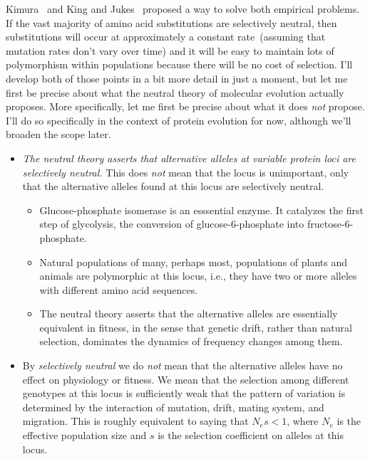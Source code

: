 Kimura~\cite{Kimura68} and King and Jukes~\cite{King-Jukes69} proposed
a way to solve both empirical problems. If the vast majority of amino
acid substitutions are selectively neutral, then substitutions will
occur at approximately a constant rate~(assuming that mutation rates
don't vary over time) and it will be easy to maintain lots of
polymorphism within populations because there will be no cost of
selection. I'll develop both of those points in a bit more detail in
just a moment, but let me first be precise about what the neutral
theory of molecular evolution actually proposes. More specifically,
let me first be precise about what it does {\it not\/} propose. I'll
do so specifically in the context of protein evolution for now,
although we'll broaden the scope later.

\begin{itemize}

\item {\it The neutral theory asserts that alternative alleles at
    variable protein loci are selectively neutral.} This does {\it
    not\/} mean that the locus is unimportant, only that the
  alternative alleles found at this locus are selectively
  neutral.

\begin{itemize}

\item Glucose-phosphate isomerase is an esssential enzyme. It
  catalyzes the first step of glycolysis, the conversion of
  glucose-6-phosphate into fructose-6-phosphate. 

\item Natural populations of many, perhaps most, populations of plants
  and animals are polymorphic at this locus, i.e., they have two or
  more alleles with different amino acid sequences.

\item The neutral theory asserts that the alternative alleles are
  essentially equivalent in fitness, in the sense that genetic drift,
  rather than natural selection, dominates the dynamics of frequency
  changes among them.

\end{itemize}

\item By {\it selectively neutral\/} we do {\it not\/} mean that the
  alternative alleles have no effect on physiology or fitness. We mean
  that the selection among different genotypes at this locus is
  sufficiently weak that the pattern of variation is determined by the
  interaction of mutation, drift, mating system, and migration. This
  is roughly equivalent to saying that $N_es < 1$, where $N_e$ is the
  effective population size and $s$ is the selection coefficient on
  alleles at this locus.


\end{itemize}
